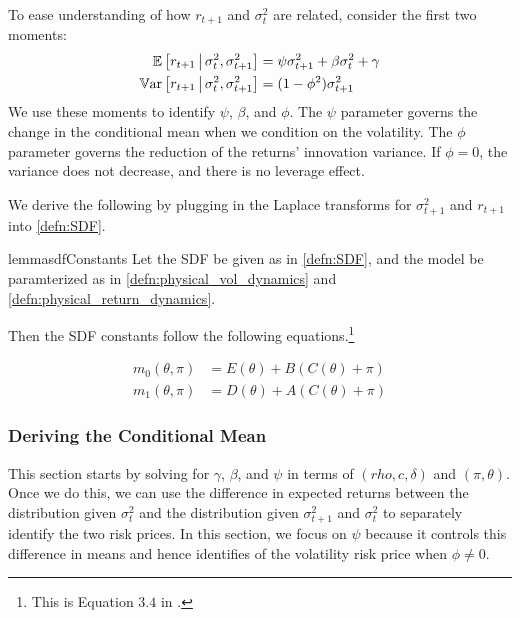 \documentclass[11pt, letterpaper, twoside]{article}
\begin{document}
To ease understanding of how $r_{t+1}$ and $\sigma^2_t$ are related, consider the first two moments:
%
\begin{align}
 \label{eqn:rtn_cond_mean}
 \operatorname{\mathbb{E}}\left[r_{t+1} \,\middle\vert\, \sigma^2_t, \sigma^2_{t+1}\right] &= \psi \sigma^2_{t+1} + \beta \sigma^2_t +
 \gamma \\
 \label{eqn:rtn_cond_vol}
 \operatorname{\mathbb{V}ar}\left[r_{t+1} \,\middle\vert\, \sigma^2_t, \sigma^2_{t+1}\right] &= (1 - \phi^2) \sigma^2_{t+1} 
\end{align}
%
We use these moments  to identify $\psi$, $\beta$, and $\phi$.  The $\psi$ parameter governs the change in the conditional mean when we condition on the volatility. The $\phi$ parameter governs the reduction of the returns' innovation variance.  If $\phi=0$, the variance does not decrease, and there is no leverage effect.

We derive the following by plugging in the Laplace transforms for $\sigma^2_{t+1}$ and $r_{t+1}$ into \cref{defn:SDF}.

\begin{restatable}{lemma}{sdfConstants}
 \label{lemma:characterizing_sdf_integration_constants}
 Let the SDF be given as in \cref{defn:SDF}, and the model be paramterized as in
 \cref{defn:physical_vol_dynamics} and \cref{defn:physical_return_dynamics}.

 Then the SDF constants follow the following equations.\footnote{This is Equation $3.4$ in
 \textcite[3.4]{han2018leverage}.}

 \begin{align}
  \label{eqn:sdf_functions_vs_physical_functions}
  m_0(\theta, \pi) &= E(\theta) + B(C(\theta) + \pi) \\
  m_1(\theta, \pi) &= D(\theta) + A(C(\theta) + \pi) \nonumber
 \end{align}

\end{restatable}


\subsubsection{Deriving the Conditional Mean}\label{sec:deriving_conditional_mean}


This section starts by solving for $\gamma$, $\beta$, and $\psi$ in terms of $(rho, c, \delta)$ and $(\pi, \theta)$. Once we do this, we can use the difference in expected returns between the distribution given $\sigma^2_t$ and the distribution given $\sigma^2_{t+1}$ and $\sigma^2_t$ to separately identify the two risk prices. In this section, we focus on $\psi$ because it controls this difference in means and hence identifies of the volatility risk price when $\phi \neq 0$.
\end{document}
